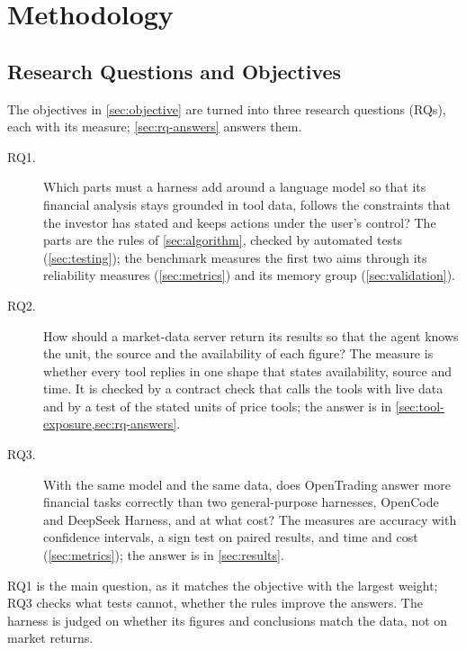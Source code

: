 \chapter{Methodology}\label{ch:methodology}

\section{Research Questions and Objectives}\label{sec:rq}
The objectives in \cref{sec:objective} are turned into three research questions (RQs), each with its measure; \cref{sec:rq-answers} answers them.
\begin{description}
  \item[RQ1.~] Which parts must a harness add around a language model so that its financial analysis stays grounded in tool data, follows the constraints that the investor has stated and keeps actions under the user's control?
  The parts are the rules of \cref{sec:algorithm}, checked by automated tests (\cref{sec:testing}); the benchmark measures the first two aims through its reliability measures (\cref{sec:metrics}) and its memory group (\cref{sec:validation}).
  \item[RQ2.~] How should a market-data server return its results so that the agent knows the unit, the source and the availability of each figure?
  The measure is whether every tool replies in one shape that states availability, source and time.
  It is checked by a contract check that calls the tools with live data and by a test of the stated units of price tools; the answer is in \cref{sec:tool-exposure,sec:rq-answers}.
  \item[RQ3.~] With the same model and the same data, does OpenTrading answer more financial tasks correctly than two general-purpose harnesses, OpenCode and DeepSeek Harness, and at what cost?
  The measures are accuracy with confidence intervals, a sign test on paired results, and time and cost (\cref{sec:metrics}); the answer is in \cref{sec:results}.
\end{description}
RQ1 is the main question, as it matches the objective with the largest weight; RQ3 checks what tests cannot, whether the rules improve the answers.
The harness is judged on whether its figures and conclusions match the data, not on market returns.

